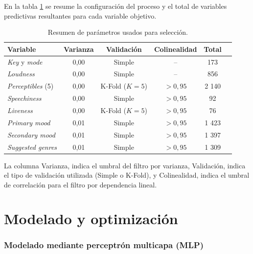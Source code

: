 En la tabla \ref{tab:resultados_seleccion} se resume la configuración del proceso y el total de variables predictivas resultantes para cada variable objetivo.
\begin{table}[htpb]
\centering
\caption{Resumen de parámetros usados para selección.}
\label{tab:resultados_seleccion}
\renewcommand{\arraystretch}{1.2}
\small
\begin{tabular}{@{}l c c c c r@{}}
\toprule
\textbf{Variable} & \textbf{Varianza} & \textbf{Validación} & \textbf{Colinealidad} & \textbf{Total} \\
\midrule
\textit{Key} y \textit{mode} & 0,00 & Simple &  -- & 173 \\
\textit{Loudness} & 0,00 & Simple & -- & 856 \\
\textit{Perceptibles} (5) & 0,00 & K-Fold ($K=5$) & $> 0,95$ & 2 140 \\
\textit{Speechiness} & 0,00 & Simple  & $> 0,95$ & 92 \\
\textit{Liveness} & 0,00 & K-Fold ($K=5$) & $> 0,95$ & 76 \\
\textit{Primary mood} & 0,01 & Simple & $> 0,95$ & 1 423 \\
\textit{Secondary mood} & 0,01 & Simple & $> 0,95$ & 1 397 \\
\textit{Suggested genres} & 0,01 & Simple & $> 0,95$ & 1 309 \\
\bottomrule
\end{tabular}
\end{table}

La columna \textquotedbl Varianza\textquotedbl, indica el umbral del filtro por varianza, \textquotedbl Validación\textquotedbl, indica el tipo de validación utilizada (Simple o K-Fold), y \textquotedbl Colinealidad\textquotedbl, indica el umbral de correlación para el filtro por dependencia lineal.

\section{Modelado y optimización}
\label{sec:modelado_optimizacion}

\subsubsection{Modelado mediante perceptrón multicapa (MLP)}
\label{sec:mlp}

